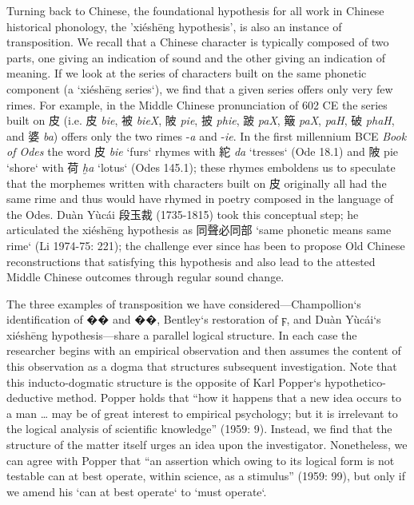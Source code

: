 Turning back to Chinese, the foundational hypothesis for all work in Chinese historical phonology, the 'xiéshēng hypothesis', is also an instance of transposition. We recall that a Chinese character is typically composed of two parts, one giving an indication of sound and the other giving an indication of meaning. If we look at the series of characters built on the same phonetic component (a `xiéshēng series`), we find that a given series offers only very few rimes.  For example, in the Middle Chinese pronunciation of 602 CE the series built on 皮 (i.e. 皮 \textit{bie}, 被 \textit{bieX},  陂 \textit{pie}, 披 \textit{phie}, 跛 \textit{paX},  簸 \textit{paX}, \textit{paH}, 破 \textit{phaH}, and 婆 \textit{ba}) offers only the two rimes -\textit{a} and -\textit{ie}. In the first millennium BCE \textit{Book of Odes} the word 皮 \textit{bie} `furs` rhymes with 紽 \textit{da} `tresses` (Ode 18.1) and 陂 pie `shore` with 荷 \textit{ḫa} `lotus` (Odes 145.1); these rhymes emboldens us to speculate that the morphemes written with characters built on 皮 originally all had the same rime and thus would have rhymed in poetry composed in the language of the Odes. Duàn Yùcái 段玉裁 (1735-1815) took this conceptual step; he articulated the xiéshēng hypothesis as 同聲必同部 `same phonetic means same rime` (Li 1974-75: 221); the challenge ever since has been to propose Old Chinese reconstructions that satisfying this hypothesis and also lead to the attested Middle Chinese outcomes through regular sound change.

The three examples of transposition we have considered—Champollion`s identification of �� and ��, Bentley`s restoration of ϝ, and Duàn Yùcái`s xiéshēng hypothesis—share a parallel logical structure. In each case the researcher begins with an empirical observation and then assumes the content of this observation as a dogma that structures subsequent investigation. Note that this inducto-dogmatic structure is the opposite of Karl Popper`s hypothetico-deductive method. Popper holds that “how it happens that a new idea occurs to a man … may be of great interest to empirical psychology; but it is irrelevant to the logical analysis of scientific knowledge” (1959: 9). Instead, we find that the structure of the matter itself urges an idea upon the investigator. Nonetheless, we can agree with Popper that “an assertion which owing to its logical form is not testable can at best operate, within science, as a stimulus” (1959: 99), but only if we amend his `can at best operate` to `must operate`.  

